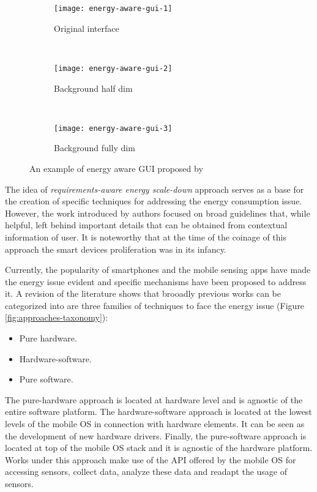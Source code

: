 \begin{figure}
        \centering
        \begin{subfigure}[b]{0.3\textwidth}
                \texttt{[image: energy-aware-gui-1]}
                \caption{Original interface}
                \label{fig:energy-aware-gui-1}
        \end{subfigure}
        ~
        \begin{subfigure}[b]{0.3\textwidth}
                \texttt{[image: energy-aware-gui-2]}
                \caption{Background half dim}
                \label{fig:energy-aware-gui-2}
        \end{subfigure}
        ~
        \begin{subfigure}[b]{0.3\textwidth}
                \texttt{[image: energy-aware-gui-3]}
                \caption{Background fully dim}
                \label{fig:energy-aware-gui-3}
        \end{subfigure}
        \caption[An example of energy aware GUI by \protect\cite{Mayo2003}]{An example of energy aware GUI proposed by \protect\cite{Mayo2003}}
        \label{fig-scaling-down-screen-usage}
\end{figure}

The idea of \emph{requirements-aware energy scale-down} approach serves as a base for the creation of specific techniques for addressing the energy consumption issue.
However, the work introduced by authors focused on broad guidelines that, while helpful, left behind important details that can be obtained from contextual information of user.
It is noteworthy that at the time of the coinage of this approach the smart devices proliferation was in its infancy.

Currently, the popularity of smartphones and the mobile sensing apps have made the energy issue evident and specific mechanisms have been proposed to address it.
A revision of the literature shows that brooadly previous works can be categorized into are three families of techniques to face the energy issue (Figure \ref{fig:approaches-taxonomy}): 

\begin{itemize}
  \item Pure hardware.
  \item Hardware-software.
  \item Pure software.
\end{itemize}

The pure-hardware approach is located at hardware level and is agnostic of the entire software platform.
The hardware-software approach is located at the lowest levels of the mobile OS in connection with hardware elements.
It can be seen as the development of new hardware drivers.
Finally, the pure-software approach is located at top of the mobile OS stack and it is agnostic of the hardware platform.
Works under this approach make use of the API offered by the mobile OS for accessing sensors, collect data, analyze these data and readapt the usage of sensors.

